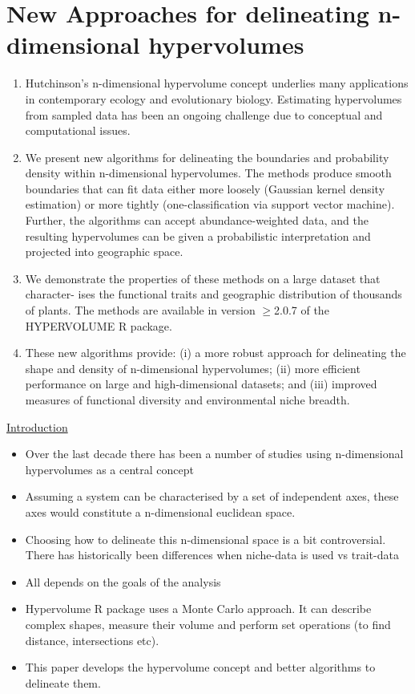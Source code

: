 \section*{New Approaches for delineating n-dimensional hypervolumes \citep{Blonder2018}}

\begin{enumerate}
	\item Hutchinson's n-dimensional hypervolume concept underlies many applications in contemporary ecology and evolutionary biology. Estimating hypervolumes from sampled data has been an ongoing challenge due to conceptual and computational issues.
	\item We present new algorithms for delineating the boundaries and probability density within n-dimensional hypervolumes. The methods produce smooth boundaries that can fit data either more loosely (Gaussian kernel density estimation) or more tightly (one-classification via support vector machine). Further, the algorithms can accept abundance-weighted data, and the resulting hypervolumes can be given a probabilistic interpretation and projected into geographic space.
	\item We demonstrate the properties of these methods on a large dataset that character- ises the functional traits and geographic distribution of thousands of plants. The methods are available in version $\geq$2.0.7 of the HYPERVOLUME R package.
	\item These new algorithms provide: (i) a more robust approach for delineating the shape and density of n-dimensional hypervolumes; (ii) more efficient performance on large and high-dimensional datasets; and (iii) improved measures of functional diversity and environmental niche breadth.
\end{enumerate}

\underline{Introduction}
\begin{itemize}
	\item Over the last decade there has been a number of studies using n-dimensional hypervolumes as a central concept
	\item Assuming a system can be characterised by a set of independent axes, these axes would constitute a n-dimensional euclidean space.
	\item Choosing how to delineate this n-dimensional space is a bit controversial. There has historically been differences when niche-data is used vs trait-data
	\item All depends on the  goals of the analysis
	\item Hypervolume R package uses a Monte Carlo approach. It can describe complex shapes, measure their volume and perform set operations	(to find distance, intersections etc).
	\item This paper develops the hypervolume concept and better algorithms to delineate them.		
\end{itemize}

